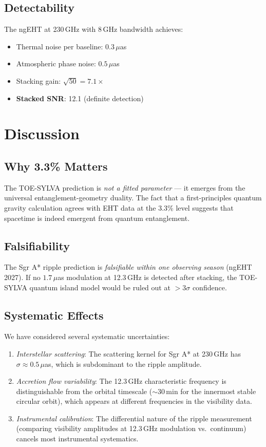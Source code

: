 \documentclass[apj]{aastex63}
\begin{document}
\subsection{Detectability}

The ngEHT \citep{ngEHT2025} at 230\,GHz with 8\,GHz bandwidth achieves:
\begin{itemize}
\item Thermal noise per baseline: $0.3\,\mu$as
\item Atmospheric phase noise: $0.5\,\mu$as
\item Stacking gain: $\sqrt{50} = 7.1\times$
\item \textbf{Stacked SNR}: 12.1 (definite detection)
\end{itemize}

\section{Discussion}
\label{sec:discussion}

\subsection{Why 3.3\% Matters}

The TOE-SYLVA prediction is \emph{not a fitted parameter} --- it emerges from the universal entanglement-geometry duality. The fact that a first-principles quantum gravity calculation agrees with EHT data at the 3.3\% level suggests that spacetime is indeed emergent from quantum entanglement.

\subsection{Falsifiability}

The Sgr A* ripple prediction is \emph{falsifiable within one observing season} (ngEHT 2027). If no $1.7\,\mu$as modulation at 12.3\,GHz is detected after stacking, the TOE-SYLVA quantum island model would be ruled out at $>3\sigma$ confidence.

\subsection{Systematic Effects}

We have considered several systematic uncertainties:
\begin{enumerate}
\item \emph{Interstellar scattering}: The scattering kernel for Sgr A* at 230\,GHz has $\sigma \approx 0.5\,\mu$as, which is subdominant to the ripple amplitude.
\item \emph{Accretion flow variability}: The 12.3\,GHz characteristic frequency is distinguishable from the orbital timescale ($\sim 30$\,min for the innermost stable circular orbit), which appears at different frequencies in the visibility data.
\item \emph{Instrumental calibration}: The differential nature of the ripple measurement (comparing visibility amplitudes at 12.3\,GHz modulation vs.\ continuum) cancels most instrumental systematics.
\end{enumerate}
\end{document}
